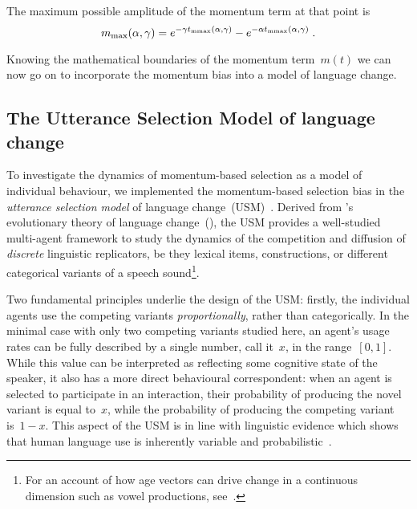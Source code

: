 \documentclass[10pt]{article}
\begin{document}
The maximum possible amplitude of the momentum term at that point is
\begin{equation}
m_{\rm max}(\alpha, \gamma)=e^{-\gamma t_{\rm mmax}(\alpha,\gamma)}-e^{-\alpha t_{\rm mmax}(\alpha,\gamma)}\;.
\end{equation}

Knowing the mathematical boundaries of the momentum term~$m(t)$ we can now go on to incorporate the momentum bias into a model of language change.

\subsection{The Utterance Selection Model of language change}

To investigate the dynamics of momentum-based selection as a model of individual behaviour, we implemented the momentum-based selection bias in the \emph{utterance selection model} of language change~(USM)~\citep{Baxter2006,Blythe2012}. Derived from \citeauthor{Croft2000}'s evolutionary theory of language change~(\citeyear{Croft2000}), the USM provides a well-studied multi-agent framework to study the dynamics of the competition and diffusion of \emph{discrete} linguistic replicators, be they lexical items, constructions, or different categorical variants of a speech sound\footnote{For an account of how age vectors can drive change in a continuous dimension such as vowel productions, see~\citet{Swarup2012}.}.

Two fundamental principles underlie the design of the USM: firstly, the individual agents use the competing variants \emph{proportionally}, rather than categorically. In the minimal case with only two competing variants studied here, an agent's usage rates can be fully described by a single number, call it~$x$, in the range~$[0,1]$.
While this value can be interpreted as reflecting some cognitive state of the speaker, it also has a more direct behavioural correspondent: when an agent is selected to participate in an interaction, their probability of producing the novel variant is equal to~$x$, while the probability of producing the competing variant is~$1-x$. This aspect of the USM is in line with linguistic evidence which shows that human language use is inherently variable and probabilistic~\citep{Kroch1994,Labov1994,Bybee2007,Nardy2013}.
\end{document}
